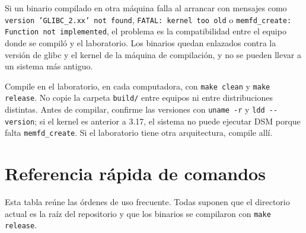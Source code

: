 Si un binario compilado en otra máquina falla al arrancar con mensajes como \texttt{version 'GLIBC\_2.xx' not found}, \texttt{FATAL: kernel too old} o \texttt{memfd\_create: Function not implemented}, el problema es la compatibilidad entre el equipo donde se compiló y el laboratorio. Los binarios quedan enlazados contra la versión de glibc y el kernel de la máquina de compilación, y no se pueden llevar a un sistema más antiguo.

Compile en el laboratorio, en cada computadora, con \texttt{make clean} y \texttt{make release}. No copie la carpeta \texttt{build/} entre equipos ni entre distribuciones distintas. Antes de compilar, confirme las versiones con \texttt{uname -r} y \texttt{ldd -{}-version}; si el kernel es anterior a 3.17, el sistema no puede ejecutar DSM porque falta \texttt{memfd\_create}. Si el laboratorio tiene otra arquitectura, compile allí.

\section{Referencia rápida de comandos}\label{sec:referencia}

Esta tabla reúne las órdenes de uso frecuente. Todas suponen que el directorio actual es la raíz del repositorio y que los binarios se compilaron con \texttt{make release}.


